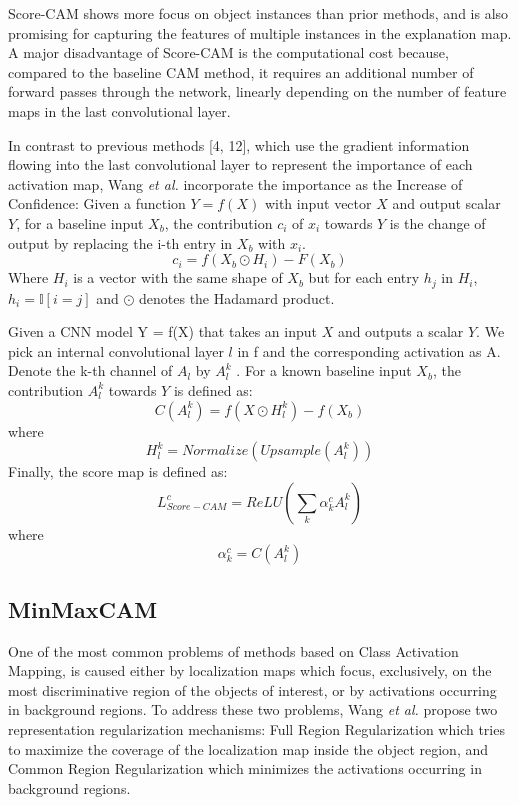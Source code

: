 Score-CAM shows more focus on object instances than prior methods, and is also promising for capturing the features of multiple instances in the explanation map. A major disadvantage of Score-CAM is the computational cost because, compared to the baseline CAM method, it requires an additional number of forward passes through the network, linearly depending on the number of feature maps in the last convolutional layer.

In contrast to previous methods [4, 12], which use the gradient information flowing into the last convolutional layer to represent the importance of each activation map, Wang \textit{et al.} incorporate the importance as the Increase of Confidence: Given a function $Y = f(X)$ with input vector $X$ and output scalar $Y$, for a baseline input $X_b$, the contribution $c_i$ of $x_i$ towards $Y$ is the change of output by replacing the i-th entry in $X_b$ with $x_i$.
\begin{equation}
    c_i = f(X_b \odot H_i) - F(X_b)
\end{equation}
Where $H_i$ is a vector with the same shape of $X_b$ but for each entry $h_j$ in $H_i$, $h_i = \mathbb{I}[i=j]$ and $\odot$ denotes the Hadamard product.

Given a CNN model Y = f(X) that takes an input $X$ and outputs a scalar $Y$. We pick an internal convolutional layer $l$ in f and the corresponding activation as A. Denote the
k-th channel of $A_l$ by $A^k_l$ . For a known baseline input $X_b$,
the contribution $A^k_l$ towards $Y$ is defined as:
\begin{equation}
    C(A^k_l) = f(X \odot H^k_l) - f(X_b)
\end{equation}
where
\begin{equation}
    H^k_l = Normalize(Upsample(A^k_l))
\end{equation}
Finally, the score map is defined as:
\begin{equation}
    L^{c}_{Score-CAM} = ReLU(\sum_{k} \alpha^{c}_{k} A^k_l)
\end{equation}
where
\begin{equation}
    \alpha^{c}_{k} = C(A^k_l)
\end{equation}

\subsection{MinMaxCAM}
One of the most common problems of methods based on Class Activation Mapping,
is caused either by localization maps which focus, exclusively, on the most discriminative region of the objects of interest, or by activations occurring
in background regions. To address these two problems, Wang \textit{et al.} \cite{wang2021minmaxcam} propose two representation regularization mechanisms: Full Region Regularization which tries to maximize the coverage of the localization map inside the object region, and Common Region Regularization which minimizes the activations occurring in background regions.

